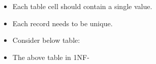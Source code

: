 \setlength{\columnsep}{3pt}
\begin{flushleft}

	\begin{itemize}
		\item Each table cell should contain a single value.
		\item Each record needs to be unique.
		\item Consider below table:
	
		
		\item The above table in 1NF-
		
		
	\end{itemize}
		
\end{flushleft}

\newpage